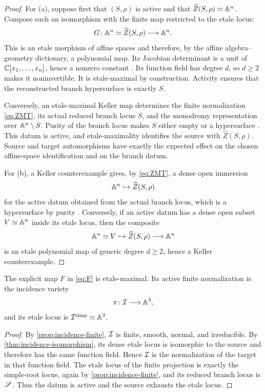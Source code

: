 \begin{proof}
For (a), suppose first that $(S,\rho)$ is active and that $\widehat Z(S,\rho)\simeq\mathbb A^n$.  Compose such an isomorphism with the finite map restricted to the etale locus:
\[
  G\colon\mathbb A^n\simeq\widehat Z(S,\rho)\longrightarrow\mathbb A^n.
\]
This is an etale morphism of affine spaces and therefore, by the affine algebra--geometry dictionary, a polynomial map.  Its Jacobian determinant is a unit of $\mathbb C[x_1,\ldots,x_n]$, hence a nonzero constant \cite[Chapter 1]{AtiyahMacdonald}.  Its function field has degree $d$, so $d\geq2$ makes it noninvertible.  It is etale-maximal by construction.  Activity ensures that the reconstructed branch hypersurface is exactly $S$.

Conversely, an etale-maximal Keller map determines the finite normalization \eqref{eq:ZMT}, its actual reduced branch locus $S$, and the monodromy representation over $\mathbb A^n\setminus S$.  Purity of the branch locus makes $S$ either empty or a hypersurface \cite[Tag 0BJE]{StacksProject}.  This datum is active, and etale-maximality identifies the source with $\widehat Z(S,\rho)$.  Source and target automorphisms have exactly the expected effect on the chosen affine-space identification and on the branch datum.

For (b), a Keller counterexample gives, by \eqref{eq:ZMT}, a dense open immersion
\[
  \mathbb A^n\hookrightarrow\widehat Z(S,\rho)
\]
for the active datum obtained from the actual branch locus, which is a hypersurface by purity \cite[Tag 0BJE]{StacksProject}.  Conversely, if an active datum has a dense open subset $V\simeq\mathbb A^n$ inside its etale locus, then the composite
\[
  \mathbb A^n\simeq V\hookrightarrow\widehat Z(S,\rho)\longrightarrow\mathbb A^n
\]
is an etale polynomial map of generic degree $d\geq2$, hence a Keller counterexample.
\end{proof}

\begin{proposition}\label{prop:F-etale-maximal}
The explicit map $F$ in \eqref{eq:F} is etale-maximal.  Its active finite normalization is the incidence variety
\[
  \pi\colon\mathcal I\longrightarrow\mathbb A^3,
\]
and its etale locus is $\mathcal I^{\mathrm{simp}}\simeq\mathbb A^3$.
\end{proposition}

\begin{proof}
By \cref{prop:incidence-finite}, $\mathcal I$ is finite, smooth, normal, and irreducible.  By \cref{thm:incidence-isomorphism}, its dense etale locus is isomorphic to the source and therefore has the same function field.  Hence $\mathcal I$ is the normalization of the target in that function field.  The etale locus of the finite projection is exactly the simple-root locus, again by \cref{prop:incidence-finite}, and its reduced branch locus is $\mathscr S$.  Thus the datum is active and the source exhausts the etale locus.
\end{proof}

